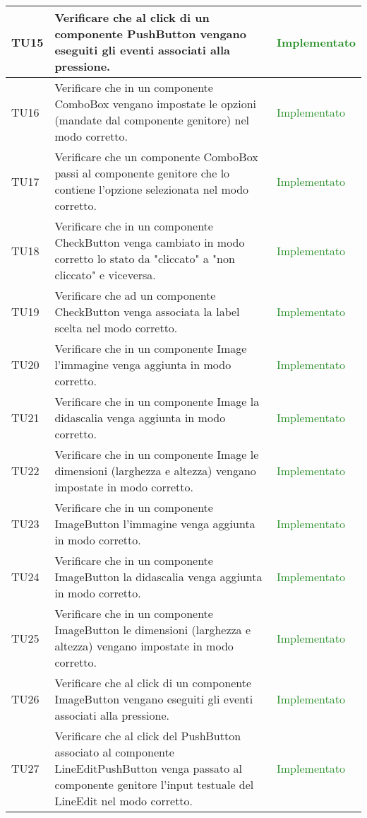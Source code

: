 \begin{center}
\begin{longtable}{|
*{1}{>{\centering\arraybackslash}p{1.5cm}|}
*{1}{>{\centering\arraybackslash}p{7.5cm}|}
*{1}{>{\centering\arraybackslash}p{3cm}|}}
 \hline 
TU15 & Verificare che al click di un componente PushButton vengano eseguiti gli eventi associati alla pressione. & \textcolor{ForestGreen}{Implementato}\\
 \hline 
TU16 & Verificare che in un componente ComboBox vengano impostate le opzioni (mandate dal componente genitore) nel modo corretto. & \textcolor{ForestGreen}{Implementato}\\
 \hline 
TU17 & Verificare che un componente ComboBox passi al componente genitore che lo contiene l'opzione selezionata nel modo corretto. & \textcolor{ForestGreen}{Implementato}\\
 \hline 
TU18 & Verificare che in un componente CheckButton venga cambiato in modo corretto lo stato da "cliccato" a "non cliccato" e viceversa. & \textcolor{ForestGreen}{Implementato}\\
 \hline 
TU19 & Verificare che ad un componente CheckButton venga associata la label scelta nel modo corretto. & \textcolor{ForestGreen}{Implementato}\\
 \hline 
TU20 & Verificare che in un componente Image l'immagine venga aggiunta in modo corretto. & \textcolor{ForestGreen}{Implementato}\\
 \hline 
TU21 & Verificare che in un componente Image la didascalia venga aggiunta in modo corretto. & \textcolor{ForestGreen}{Implementato}\\
 \hline 
TU22 & Verificare che in un componente Image le dimensioni (larghezza e altezza) vengano impostate in modo corretto. & \textcolor{ForestGreen}{Implementato}\\
 \hline 
TU23 & Verificare che in un componente ImageButton l'immagine venga aggiunta in modo corretto. & \textcolor{ForestGreen}{Implementato}\\
 \hline 
TU24 & Verificare che in un componente ImageButton la didascalia venga aggiunta in modo corretto. & \textcolor{ForestGreen}{Implementato}\\
 \hline 
TU25 & Verificare che in un componente ImageButton le dimensioni (larghezza e altezza) vengano impostate in modo corretto. & \textcolor{ForestGreen}{Implementato}\\
 \hline 
TU26 & Verificare che al click di un componente ImageButton vengano eseguiti gli eventi associati alla pressione. & \textcolor{ForestGreen}{Implementato}\\
 \hline 
TU27 & Verificare che al click del PushButton associato al componente LineEditPushButton venga passato al componente genitore l'input testuale del LineEdit nel modo corretto. & \textcolor{ForestGreen}{Implementato}\\

\end{longtable}
\end{center}
